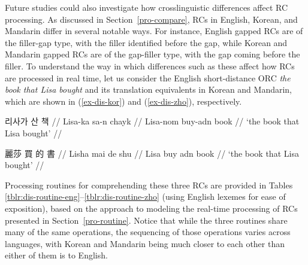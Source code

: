 Future studies could also investigate how crosslinguistic differences affect RC processing. As discussed in Section~\ref{pro-compare}, RCs in English, Korean, and Mandarin differ in several notable ways. For instance, English gapped RCs are of the filler-gap type, with the filler identified before the gap, while Korean and Mandarin gapped RCs are of the gap-filler type, with the gap coming before the filler. To understand the way in which differences such as these affect how RCs are processed in real time, let us consider the English short-distance ORC \textit{the book that Lisa bought} and its translation equivalents in Korean and Mandarin, which are shown in (\ref{ex-dis-kor}) and (\ref{ex-dis-zho}), respectively.

\ex[everygla=\ko]
\begingl 
\gla 리사가 산 책 // \label{ex-dis-kor}
\glb Lisa-ka sa-n chayk //
\glc Lisa-{\sc nom} buy-{\sc adn} book //
\glft `the book that Lisa bought' //
\endgl 
\xe 

\ex[everygla=\zh]
\begingl 
\gla 麗莎 買 的 書 // \label{ex-dis-zho}
\glb Lisha mai de shu //
\glc Lisa buy {\sc adn} book //
\glft `the book that Lisa bought' //
\endgl 
\xe

\noindent Processing routines for comprehending these three RCs are provided in Tables \ref{tblr:dis-routine-eng}--\ref{tblr:dis-routine-zho} (using English lexemes for ease of exposition), based on the approach to modeling the real-time processing of RCs presented in Section~\ref{pro-routine}. Notice that while the three routines share many of the same operations, the sequencing of those operations varies across languages, with Korean and Mandarin being much closer to each other than either of them is to English. 


